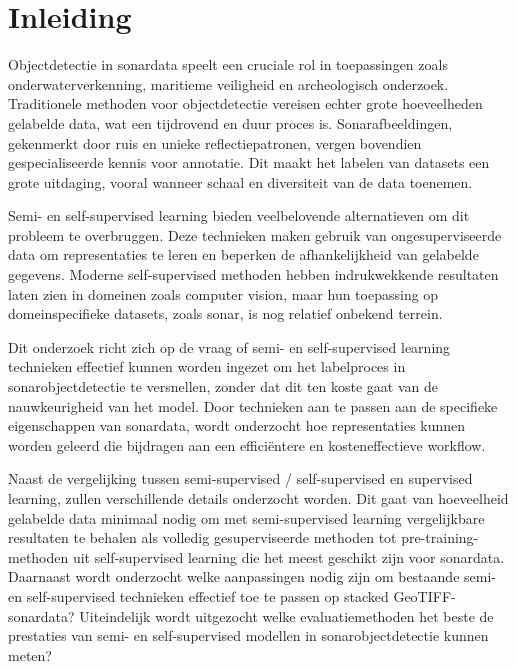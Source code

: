 
\section{Inleiding}%
\label{sec:inleiding}

Objectdetectie in sonardata speelt een cruciale rol in toepassingen zoals onderwaterverkenning, maritieme veiligheid en archeologisch onderzoek. Traditionele methoden voor objectdetectie vereisen echter grote hoeveelheden gelabelde data, wat een tijdrovend en duur proces is. Sonarafbeeldingen, gekenmerkt door ruis en unieke reflectiepatronen, vergen bovendien gespecialiseerde kennis voor annotatie. Dit maakt het labelen van datasets een grote uitdaging, vooral wanneer schaal en diversiteit van de data toenemen.

Semi- en self-supervised learning bieden veelbelovende alternatieven om dit probleem te overbruggen. Deze technieken maken gebruik van ongesuperviseerde data om representaties te leren en beperken de afhankelijkheid van gelabelde gegevens. Moderne self-supervised methoden hebben indrukwekkende resultaten laten zien in domeinen zoals computer vision, maar hun toepassing op domeinspecifieke datasets, zoals sonar, is nog relatief onbekend terrein.

Dit onderzoek richt zich op de vraag of semi- en self-supervised learning technieken effectief kunnen worden ingezet om het labelproces in sonarobjectdetectie te versnellen, zonder dat dit ten koste gaat van de nauwkeurigheid van het model. Door technieken aan te passen aan de specifieke eigenschappen van sonardata, wordt onderzocht hoe representaties kunnen worden geleerd die bijdragen aan een efficiëntere en kosteneffectieve workflow.

Naast de vergelijking tussen semi-supervised / self-supervised en supervised learning, zullen verschillende details onderzocht worden. Dit gaat van hoeveelheid gelabelde data minimaal nodig om met semi-supervised learning vergelijkbare resultaten te behalen als volledig gesuperviseerde methoden tot pre-training-methoden uit self-supervised learning die het meest geschikt zijn voor sonardata. Daarnaast wordt onderzocht welke aanpassingen nodig zijn om bestaande semi- en self-supervised technieken effectief toe te passen op stacked GeoTIFF-sonardata? Uiteindelijk wordt uitgezocht welke evaluatiemethoden het beste de prestaties van semi- en self-supervised modellen in sonarobjectdetectie kunnen meten?

